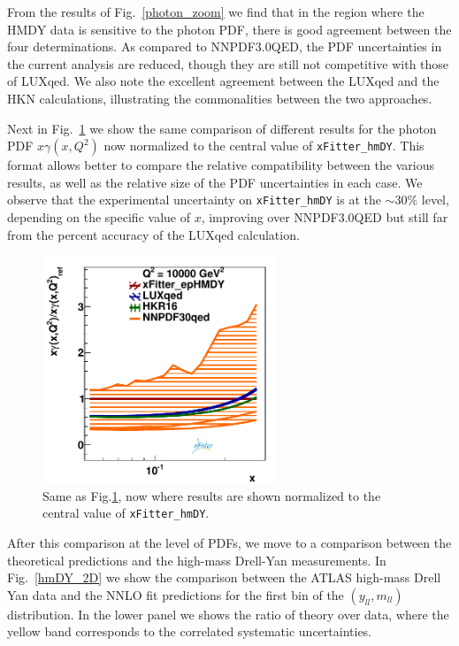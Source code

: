 From the results of Fig.~\ref{photon_zoom} we find that in the region where the HMDY data is
sensitive to the photon PDF, there is good agreement between the four determinations.
%
As compared to NNPDF3.0QED, the PDF uncertainties in the current analysis are reduced, though
they are still not competitive with those of LUXqed.
%
We also note the excellent agreement between the LUXqed and the HKN calculations,
illustrating the commonalities between the two approaches.

Next in Fig.~\ref{photon_zoom_ratio} we show the same comparison of different
results for the photon PDF $x\gamma(x,Q^2)$ now normalized to the central value of {\tt xFitter\_hmDY}.
%
This format allows better to compare the relative compatibility between the various results,
as well as the relative size of the PDF uncertainties in each case.
%
We observe that the experimental uncertainty on {\tt xFitter\_hmDY} is at the $\sim 30\%$ level,
depending on the specific value of $x$, improving over NNPDF3.0QED but still far from the
percent accuracy of the LUXqed calculation.

\begin{figure}[h]
\includegraphics[width=7cm]{figs/photon_comp_10000_ratio.pdf} 
\caption{Same as Fig.\ref{photon_zoom_ratio}, now where results
  are shown normalized to the central value of {\tt xFitter\_hmDY}.
  }
\label{photon_zoom_ratio}
\end{figure}

After this comparison at the level of PDFs, we move to a comparison between the theoretical
predictions and the high-mass Drell-Yan measurements.
%
In Fig.~\ref{hmDY_2D} we show the
comparison between the ATLAS high-mass Drell Yan data and the NNLO fit predictions
for the first bin of the $(y_{ll},m_{ll})$ distribution.
%
In the lower panel we shows the ratio of theory over data, where the yellow band
  corresponds to the correlated systematic uncertainties.

